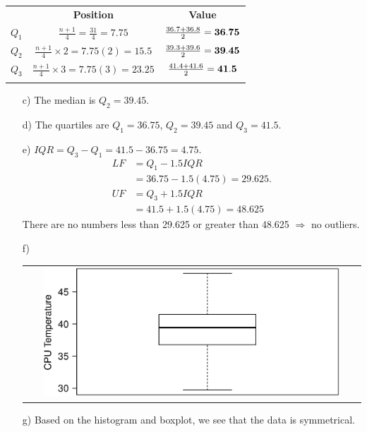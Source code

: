 \documentclass[12pt]{article}
\begin{document}
{\begin{minipage}[t]{0.98\textwidth}
\begin{minipage}[t]{0.47\textwidth}
\begin{tabular}{c|c|c}
 & {\bf Position} & {\bf Value} \\[0.1cm]
$Q_1$ & $\tfrac{n+1}{4} = \tfrac{31}{4} = 7.75$ & $\tfrac{36.7+36.8}{2} = {\bf36.75}$\\[0.3cm]
$Q_2$ & $\tfrac{n+1}{4}\times2 = 7.75(2) = 15.5$ & $\tfrac{39.3+39.6}{2} = {\bf39.45}$\\[0.3cm]
$Q_3$ & $\tfrac{n+1}{4}\times3 = 7.75(3) = 23.25$ & $\tfrac{41.4+41.6}{2} = {\bf41.5}$\\
\multicolumn{3}{c}{}\\
\end{tabular}
\begin{enumerate}
\item[c)] The median is $Q_2 = 39.45.$
\item[d)] The quartiles are $Q_1 = 36.75$, $Q_2 = 39.45$ and $Q_3 = 41.5.$
\item[e)] $IQR = Q_3 - Q_1 = 41.5-36.75 = 4.75.$\\[-0.6cm]
\begin{align*}
LF &= Q_1 - 1.5 IQR \\
&= 36.75 - 1.5(4.75) = 29.625.\\[0.3cm]
UF &= Q_3 + 1.5 IQR \\
&= 41.5 + 1.5(4.75) = 48.625
\end{align*}
There are no numbers less than 29.625 or greater than 48.625
$\Rightarrow$ no outliers.
\item[f)]
\begin{tabular}{c}
\includegraphics[width=0.9\textwidth, trim = 0.0cm 0.5cm 0.3cm 1.5cm, clip]{Bxp}\\
\end{tabular}
\item[g)] Based on the histogram and boxplot, we see that the data is symmetrical.
\end{enumerate}
\end{minipage}
\end{minipage}}\vspace{0.03\textwidth}
\end{document}
